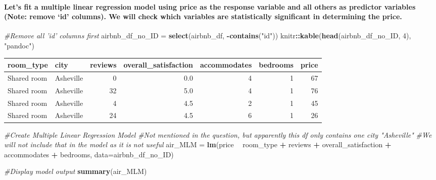 \documentclass[]{article}
\newenvironment{Shaded}{\begin{snugshade}}{\end{snugshade}}
\newcommand{\CommentTok}[1]{\textcolor[rgb]{0.56,0.35,0.01}{\textit{#1}}}
\newcommand{\DataTypeTok}[1]{\textcolor[rgb]{0.13,0.29,0.53}{#1}}
\newcommand{\DecValTok}[1]{\textcolor[rgb]{0.00,0.00,0.81}{#1}}
\newcommand{\KeywordTok}[1]{\textcolor[rgb]{0.13,0.29,0.53}{\textbf{#1}}}
\newcommand{\NormalTok}[1]{#1}
\newcommand{\OperatorTok}[1]{\textcolor[rgb]{0.81,0.36,0.00}{\textbf{#1}}}
\newcommand{\StringTok}[1]{\textcolor[rgb]{0.31,0.60,0.02}{#1}}
\let\oldparagraph\paragraph
\renewcommand{\paragraph}[1]{\oldparagraph{#1}\mbox{}}
\begin{document}
\hypertarget{lets-fit-a-multiple-linear-regression-model-using-price-as-the-response-variable-and-all-others-as-predictor-variables-note-remove-id-columns.-we-will-check-which-variables-are-statistically-significant-in-determining-the-price.}{%
\paragraph{Let's fit a multiple linear regression model using price as
the response variable and all others as predictor variables (Note:
remove `id' columns). We will check which variables are statistically
significant in determining the
price.}\label{lets-fit-a-multiple-linear-regression-model-using-price-as-the-response-variable-and-all-others-as-predictor-variables-note-remove-id-columns.-we-will-check-which-variables-are-statistically-significant-in-determining-the-price.}}

\begin{Shaded}
\begin{Highlighting}[]
\CommentTok{#Remove all 'id' columns first}
\NormalTok{airbnb_df_no_ID =}\StringTok{ }\KeywordTok{select}\NormalTok{(airbnb_df, }\OperatorTok{-}\KeywordTok{contains}\NormalTok{(}\StringTok{"id"}\NormalTok{))}
\NormalTok{knitr}\OperatorTok{::}\KeywordTok{kable}\NormalTok{(}\KeywordTok{head}\NormalTok{(airbnb_df_no_ID, }\DecValTok{4}\NormalTok{), }\StringTok{"pandoc"}\NormalTok{)}
\end{Highlighting}
\end{Shaded}

\begin{longtable}[]{@{}llrrrrr@{}}
\toprule
room\_type & city & reviews & overall\_satisfaction & accommodates &
bedrooms & price\tabularnewline
\midrule
\endhead
Shared room & Asheville & 0 & 0.0 & 4 & 1 & 67\tabularnewline
Shared room & Asheville & 32 & 5.0 & 4 & 1 & 76\tabularnewline
Shared room & Asheville & 4 & 4.5 & 2 & 1 & 45\tabularnewline
Shared room & Asheville & 24 & 4.5 & 6 & 1 & 26\tabularnewline
\bottomrule
\end{longtable}

\begin{Shaded}
\begin{Highlighting}[]
\CommentTok{#Create Multiple Linear Regression Model}
\CommentTok{#Not mentioned in the question, but apparently this df only contains one city "Asheville"}
\CommentTok{#We will not include that in the model as it is not useful}
\NormalTok{air_MLM =}\StringTok{ }\KeywordTok{lm}\NormalTok{(price }\OperatorTok{~}\StringTok{ }\NormalTok{room_type }\OperatorTok{+}\StringTok{ }\NormalTok{reviews }\OperatorTok{+}\StringTok{ }\NormalTok{overall_satisfaction }\OperatorTok{+}\StringTok{ }\NormalTok{accommodates }\OperatorTok{+}\StringTok{ }\NormalTok{bedrooms, }\DataTypeTok{data=}\NormalTok{airbnb_df_no_ID)}

\CommentTok{#Display model output}
\KeywordTok{summary}\NormalTok{(air_MLM)}
\end{Highlighting}
\end{Shaded}
\end{document}
